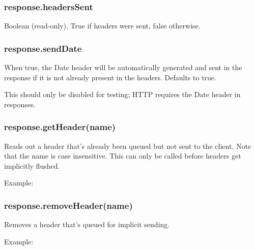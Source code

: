 \subsubsection{response.headersSent}

Boolean (read-only). True if headers were sent, false otherwise.

\subsubsection{response.sendDate}

When true, the Date header will be automatically generated and sent in
the response if it is not already present in the headers. Defaults to
true.

This should only be disabled for testing; HTTP requires the Date header
in responses.

\subsubsection{response.getHeader(name)}

Reads out a header that's already been queued but not sent to the
client. Note that the name is case insensitive. This can only be called
before headers get implicitly flushed.

Example:

\begin{Shaded}
\begin{Highlighting}[]
 \NormalTok{(}\NormalTok{);}
\end{Highlighting}
\end{Shaded}

\subsubsection{response.removeHeader(name)}

Removes a header that's queued for implicit sending.

Example:

\begin{Shaded}
\begin{Highlighting}[]
\NormalTok{(}\NormalTok{);}
\end{Highlighting}
\end{Shaded}

